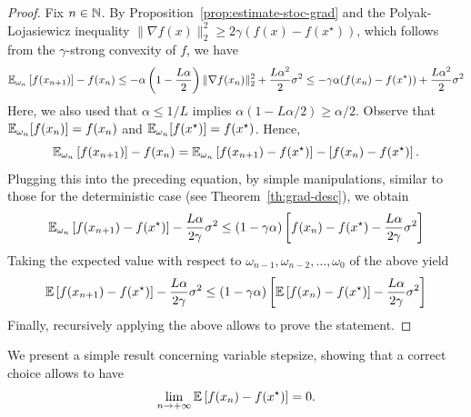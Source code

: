      \begin{proof}
         Fix $n\in\mathbb{N}$.
         By Proposition~\ref{prop:estimate-stoc-grad} and the Polyak-Lojasiewicz inequality $\|\nabla f(x)\|_2^2\ge 2\gamma (f(x)-f(x^\star))$, which follows from the $\gamma$-strong convexity of $f$, we have
         \begin{equation}
             \mathbb{E}_{\omega_n}\left[ f(x_{n+1}) \right] -f(x_n)
             \le	-\alpha\left( 1 - \frac{L\alpha}{2}\right)\|\nabla f(x_n)\|_2^2+\frac{L\alpha^2}{2}\sigma^2
             \le	-\gamma\alpha (f(x_n)-f(x^\star))+\frac{L\alpha^2}{2}\sigma^2
         \end{equation}
         Here, we also used that $\alpha\le 1/L$ implies $\alpha(1-L\alpha/2)\ge \alpha/2$.
         Observe that $\mathbb{E}_{\omega_n}[f(x_n)]=f(x_n)$ and $\mathbb{E}_{\omega_n}[f(x^\star)]=f(x^\star)$. Hence,
         \begin{equation}
             \mathbb{E}_{\omega_n}\left[ f(x_{n+1}) \right] -f(x_n) = \mathbb{E}_{\omega_n}\left[ f(x_{n+1}) -f(x^\star)\right] -\left[f(x_n) - f(x^\star) \right].
         \end{equation}
         Plugging this into the preceding equation, by simple manipulations, similar to those for the deterministic case (see Theorem~\ref{th:grad-desc}), we obtain
         \begin{equation}
             \mathbb{E}_{\omega_n}\left[ f(x_{n+1}) -f(x^\star)\right]	-\frac{L\alpha}{2\gamma} \sigma^2 \le (1-\gamma\alpha)\left[  f(x_{n}) -f(x^\star)	-\frac{L\alpha}{2\gamma} \sigma^2 \right]
         \end{equation}
         Taking the expected value with respect to $\omega_{n-1}, \omega_{n-2},\ldots, \omega_0$ of the above yield
         \begin{equation}
             \label{eq:ciao}
             \mathbb{E}\left[ f(x_{n+1}) -f(x^\star)\right]	-\frac{L\alpha}{2\gamma} \sigma^2 \le (1-\gamma\alpha)\left[  \mathbb{E}\left[f(x_{n}) -f(x^\star)\right]	-\frac{L\alpha}{2\gamma} \sigma^2 \right]
         \end{equation}
         Finally, recursively applying the above allows to prove the statement.
     \end{proof}
 
     We present a simple result concerning variable stepsize, showing that a correct choice allows to have
     \begin{equation}
         \lim_{n\to +\infty} \mathbb{E}\left[ f(x_n)-f(x^\star) \right] = 0.
     \end{equation}
 
